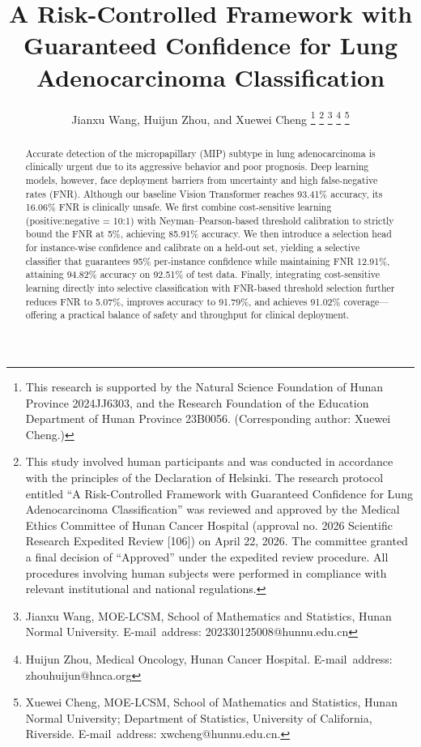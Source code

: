 \documentclass[journal,twoside,web]{ieeecolor}
\begin{document}
\title{A Risk-Controlled Framework with Guaranteed Confidence for Lung Adenocarcinoma Classification}
\author{Jianxu Wang, Huijun Zhou, and Xuewei Cheng
\thanks{This research is supported by the Natural Science Foundation of Hunan Province 2024JJ6303, and the Research Foundation of the Education Department of Hunan Province 23B0056. (Corresponding author: Xuewei Cheng.)}
\thanks{This study involved human participants and was conducted in accordance with the principles of the Declaration of Helsinki. The research protocol entitled “A Risk-Controlled Framework with Guaranteed Confidence for Lung Adenocarcinoma Classification” was reviewed and approved by the Medical Ethics Committee of Hunan Cancer Hospital (approval no. 2026 Scientific Research Expedited Review [106]) on April 22, 2026. The committee granted a final decision of “Approved” under the expedited review procedure. All procedures involving human subjects were performed in compliance with relevant institutional and national regulations.}
\thanks{Jianxu Wang, MOE-LCSM, School of Mathematics and Statistics, Hunan Normal University. E-mail~address: 202330125008@hunnu.edu.cn}
\thanks{Huijun Zhou, Medical Oncology, Hunan Cancer Hospital. E-mail~address: zhouhuijun@hnca.org}
\thanks{Xuewei Cheng, MOE-LCSM, School of Mathematics and Statistics, Hunan Normal University; Department of Statistics, University of California, Riverside. E-mail~address: xwcheng@hunnu.edu.cn.}
}

\maketitle

\begin{abstract}
Accurate detection of the micropapillary (MIP) subtype in lung adenocarcinoma is clinically urgent due to its aggressive behavior and poor prognosis. Deep learning models, however, face deployment barriers from uncertainty and high false-negative rates (FNR). Although our baseline Vision Transformer reaches 93.41\% accuracy, its 16.06\% FNR is clinically unsafe. We first combine cost-sensitive learning (positive:negative = 10:1) with Neyman--Pearson-based threshold calibration to strictly bound the FNR at 5\%, achieving 85.91\% accuracy. We then introduce a selection head for instance-wise confidence and calibrate on a held-out set, yielding a selective classifier that guarantees 95\% per-instance confidence while maintaining FNR 12.91\%, attaining 94.82\% accuracy on 92.51\% of test data. Finally, integrating cost-sensitive learning directly into selective classification with FNR-based threshold selection further reduces FNR to 5.07\%, improves accuracy to 91.79\%, and achieves 91.02\% coverage---offering a practical balance of safety and throughput for clinical deployment.
\end{abstract}
\end{document}
